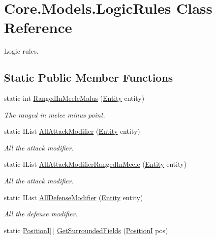 \hypertarget{classCore_1_1Models_1_1LogicRules}{}\section{Core.\+Models.\+Logic\+Rules Class Reference}
\label{classCore_1_1Models_1_1LogicRules}


Logic rules.  


\subsection*{Static Public Member Functions}
\begin{DoxyCompactItemize}
\item 
static int \hyperlink{classCore_1_1Models_1_1LogicRules_a81fbf661595253620a63091f139e78e8}{Ranged\+In\+Meele\+Malus} (\hyperlink{classCore_1_1Models_1_1Entity}{Entity} entity)
\begin{DoxyCompactList}\small\item\em The ranged in melee minus point. \end{DoxyCompactList}\item 
static I\+List \hyperlink{classCore_1_1Models_1_1LogicRules_a6f32bcf0c8d5d0de815beb46dd8e5051}{All\+Attack\+Modifier} (\hyperlink{classCore_1_1Models_1_1Entity}{Entity} entity)
\begin{DoxyCompactList}\small\item\em All the attack modifier. \end{DoxyCompactList}\item 
static I\+List \hyperlink{classCore_1_1Models_1_1LogicRules_a839324078b8c500d9f0904aed9f2a896}{All\+Attack\+Modifier\+Ranged\+In\+Meele} (\hyperlink{classCore_1_1Models_1_1Entity}{Entity} entity)
\begin{DoxyCompactList}\small\item\em All the attack modifier. \end{DoxyCompactList}\item 
static I\+List \hyperlink{classCore_1_1Models_1_1LogicRules_a24a0497c12320f232a258db77045ea03}{All\+Defense\+Modifier} (\hyperlink{classCore_1_1Models_1_1Entity}{Entity} entity)
\begin{DoxyCompactList}\small\item\em All the defense modifier. \end{DoxyCompactList}\item 
static \hyperlink{classCore_1_1Models_1_1PositionI}{Position\+I}\mbox{[}$\,$\mbox{]} \hyperlink{classCore_1_1Models_1_1LogicRules_a27e2ffeb0da34f1119908281fc5a6510}{Get\+Surrounded\+Fields} (\hyperlink{classCore_1_1Models_1_1PositionI}{Position\+I} pos)

\end{DoxyCompactItemize}
